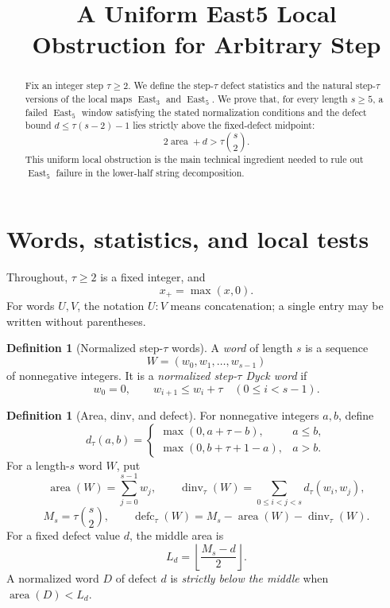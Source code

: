 \documentclass[11pt]{article}
\title{A Uniform East5 Local Obstruction for Arbitrary Step}
\author{}
\date{}
\theoremstyle{definition}
\newtheorem{definition}[theorem]{Definition}
\theoremstyle{remark}
\newcommand{\area}{\operatorname{area}}
\newcommand{\dinv}{\operatorname{dinv}}
\newcommand{\defc}{\operatorname{defc}}
\newcommand{\East}{\operatorname{East}}
\begin{document}
\maketitle

\begin{abstract}
Fix an integer step \(\tau\ge2\).  We define the step-\(\tau\) defect
statistics and the natural step-\(\tau\) versions of the local maps
\(\East_3\) and \(\East_5\).  We prove that, for every length \(s\ge5\),
a failed \(\East_5\) window satisfying the stated normalization
conditions and the defect bound \(d\le\tau(s-2)-1\) lies strictly above
the fixed-defect midpoint:
\[
  2\area+d>\tau\binom{s}{2}.
\]
This uniform local obstruction is the main technical ingredient needed
to rule out \(\East_5\) failure in the lower-half string decomposition.
\end{abstract}

\section{Words, statistics, and local tests}

Throughout, \(\tau\ge2\) is a fixed integer, and
\[
  x_+=\max(x,0).
\]
For words \(U,V\), the notation \(U:V\) means concatenation; a single
entry may be written without parentheses.

\begin{definition}[Normalized step-\(\tau\) words]
A \emph{word} of length \(s\) is a sequence
\[
  W=(w_0,w_1,\ldots,w_{s-1})
\]
of nonnegative integers.  It is a \emph{normalized step-\(\tau\) Dyck
word} if
\[
  w_0=0,
  \qquad
  w_{i+1}\le w_i+\tau
  \quad(0\le i<s-1).
\]
\end{definition}

\begin{definition}[Area, dinv, and defect]
For nonnegative integers \(a,b\), define
\[
  d_\tau(a,b)=
  \begin{cases}
    \max(0,a+\tau-b),&a\le b,\\[2mm]
    \max(0,b+\tau+1-a),&a>b.
  \end{cases}
\]
For a length-\(s\) word \(W\), put
\[
  \area(W)=\sum_{j=0}^{s-1}w_j,
  \qquad
  \dinv_\tau(W)=\sum_{0\le i<j<s}d_\tau(w_i,w_j),
\]
\[
  M_s=\tau\binom{s}{2},
  \qquad
  \defc_\tau(W)=M_s-\area(W)-\dinv_\tau(W).
\]
For a fixed defect value \(d\), the middle area is
\[
  L_d=\left\lfloor\frac{M_s-d}{2}\right\rfloor.
\]
A normalized word \(D\) of defect \(d\) is \emph{strictly below the
middle} when \(\area(D)<L_d\).
\end{definition}
\end{document}
